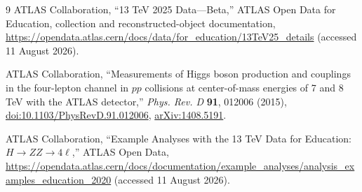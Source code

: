 \documentclass[11pt,a4paper]{article}
\begin{document}
\begin{thebibliography}{9}
ATLAS Collaboration, ``13 TeV 2025 Data---Beta,'' ATLAS Open Data for Education, collection and reconstructed-object documentation, \url{https://opendata.atlas.cern/docs/data/for_education/13TeV25_details} (accessed 11 August 2026).

ATLAS Collaboration, ``Measurements of Higgs boson production and couplings in the four-lepton channel in $pp$ collisions at center-of-mass energies of 7 and 8 TeV with the ATLAS detector,'' \emph{Phys. Rev. D} \textbf{91}, 012006 (2015), \href{https://doi.org/10.1103/PhysRevD.91.012006}{doi:10.1103/PhysRevD.91.012006}, \href{https://arxiv.org/abs/1408.5191}{arXiv:1408.5191}.

ATLAS Collaboration, ``Example Analyses with the 13 TeV Data for Education: $H\to ZZ\to4\ell$,'' ATLAS Open Data, \url{https://opendata.atlas.cern/docs/documentation/example_analyses/analysis_examples_education_2020} (accessed 11 August 2026).
\end{thebibliography}
\end{document}
